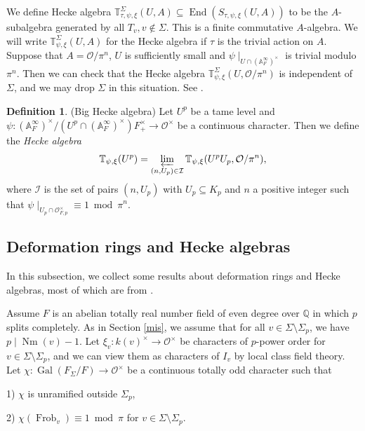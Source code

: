 \documentclass[12pt]{amsart}
\theoremstyle{plain}
\theoremstyle{definition}
\newtheorem{defn}[thm]{Definition}
\theoremstyle{remark}
\begin{document}
We define Hecke algebra $\mathbb{T}_{\tau, \psi, \xi} ^\Sigma (U,A) \subseteq \operatorname{End}(S_{\tau, \psi, \xi}(U,A))$ to be the $A$-subalgebra generated  by all $T_v, v \notin \Sigma$. This is a finite commutative $A$-algebra. We will write $\mathbb{T}_{\psi, \xi}^\Sigma (U,A)$ for the Hecke algebra if $\tau $ is the trivial action on $A$. Suppose that $A= \mathcal{O}/ \pi^n$, $ U$ is sufficiently small and $\psi \mid_{U \cap (\mathbb{A}_F^\infty)^\times} $ is trivial modulo $ \pi^n$. Then we can check that the Hecke algebra $\mathbb{T}_{\psi, \xi}^\Sigma (U, \mathcal{O}/ \pi^n)$ is independent of $\Sigma$, and we may drop $\Sigma$ in this situation. See \cite[3.3.3]{pan2022fontaine}.

\begin{defn} (Big Hecke algebra) \label{big}
	Let $U^p$ be a tame level and $\psi: (\mathbb{A}_F^\infty)^\times/ (U^p \cap (\mathbb{A}_F^\infty)^\times)F_+^\times \to \mathcal{O}^\times$ be a continuous character. Then we define the \textit{Hecke algebra} $$
	\mathbb{T}_{\psi, \xi}(U^p) = \varprojlim_{(n, U_p) \in \mathcal{I}} \mathbb{T}_{\psi, \xi}(U^pU_p, \mathcal{O}/\pi^n), $$
where $\mathcal{I}$ is the set of pairs $(n, U_p)$ with $U_p \subseteq K_p$ and $n$ a positive integer such that $ \psi \mid_{U_p \cap \mathcal{O}_{F,p}^\times} \equiv 1~ \operatorname{mod}~\pi^n$.
	
\end{defn}


\subsection{Deformation rings and Hecke algebras}\label{sec 2}
In this subsection, we collect some results about deformation rings and Hecke algebras, most of which are from \cite{pan2022fontaine}.

Assume $F$ is an abelian totally real number field of even degree over $\mathbb{Q}$ in which $p$ splits completely. As in Section \ref{mis}, we assume that for all $v \in \Sigma \setminus \Sigma_p$, we have $p \mid \operatorname{Nm}(v)-1$. Let $\xi_v: k(v)^\times \to \mathcal{O}^\times$ be characters of $p$-power order for $v \in \Sigma \setminus \Sigma_p$, and we can view them as characters of $I_v$ by local class field theory. Let $\chi: \operatorname{Gal}(F_{\Sigma}/F) \to \mathcal{O}^{\times}$ be a continuous totally odd character such that 

1) $\chi$ is unramified outside $ \Sigma_p$,

2) $\chi(\operatorname{Frob}_v) \equiv 1~\operatorname{mod}~\pi$ for  
$v \in \Sigma \setminus \Sigma_p$.
\\
\end{document}
